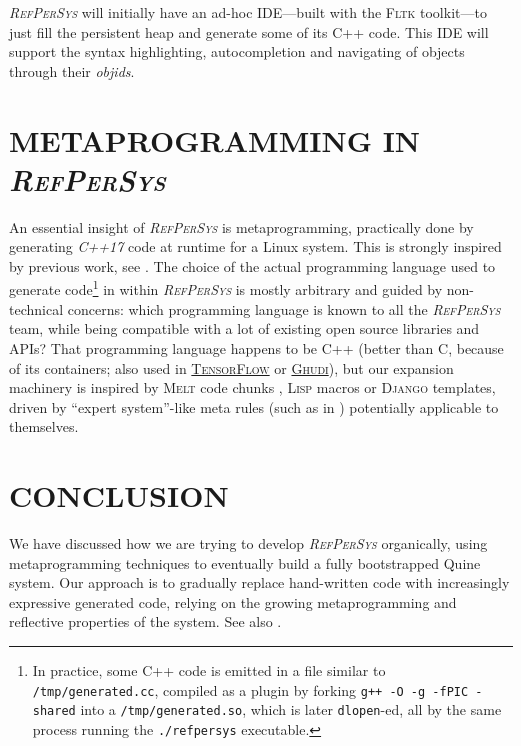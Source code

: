 \documentclass{ecai}
\newcommand{\RefPerSys}{{\textit{\textsc{RefPerSys}}}}
\begin{document}
{\RefPerSys} will initially have an ad-hoc IDE---built with the \textsc{Fltk}
toolkit---to just fill the persistent heap and generate some of its C++
code. This IDE will support the syntax highlighting, autocompletion and
navigating of objects through their \emph{objids}.


\section{METAPROGRAMMING IN \RefPerSys}
\label{sec:metaprogramming}

An essential insight of {\RefPerSys} is metaprogramming, practically
done by generating \emph{C++17} code at runtime for a Linux
system. This is strongly inspired by previous work, see
\cite{Pitrat:1996:FGCS, Pitrat:2009:ArtifBeings,
  Starynkevitch:2019:bismon-draft, Starynkevitch-DSL2011,
  Starynkevitch:2007:Multistage}. The choice of the actual programming
language used to generate code\footnote{In practice, some C++ code is
emitted in a file similar to \texttt{/tmp/generated.cc}, compiled as a
plugin by forking \texttt{g++ -O -g -fPIC -shared} into a
\texttt{/tmp/generated.so}, which is later \texttt{dlopen}-ed, all by
the same process running the \texttt{./refpersys} executable.} in
within {\RefPerSys} is mostly arbitrary and guided by non-technical
concerns: which programming language is known to all the {\RefPerSys}
team, while being compatible with a lot of existing open source
libraries and APIs? That programming language happens to be C++
(better than C, because of its containers; also used in
\href{http://tensorflow.org}{\textsc{TensorFlow}} or
\href{https://gudhi.inria.fr/}{\textsc{Ghudi}}), but our expansion
machinery is inspired by \textsc{Melt} code chunks
\cite{Starynkevitch-DSL2011}, \textsc{Lisp} macros
\cite{Queinnec:1996:LSP} or \textsc{Django} templates, driven by
``expert system''-like meta rules (such as in \cite{Pitrat:1996:FGCS})
potentially applicable to themselves.



\bigskip

\section{CONCLUSION}
We have discussed how we are trying to develop {\RefPerSys} organically,
using metaprogramming techniques to eventually build a fully bootstrapped
Quine system. Our approach is to gradually replace hand-written code with
increasingly expressive generated code, relying on the growing metaprogramming
and reflective properties of the system. See also \cite{starynkevitch:2019:refpersys-design}.
\end{document}
